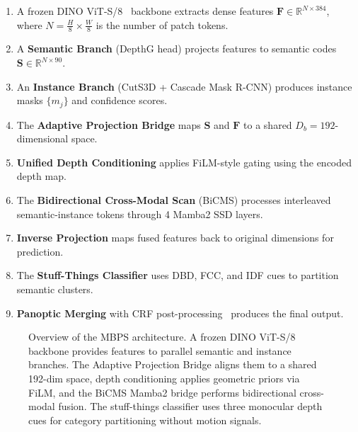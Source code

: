 \documentclass{article}
\begin{document}
\begin{enumerate}
    \item A frozen DINO ViT-S/8~\cite{caron2021dino} backbone extracts dense features $\mathbf{F} \in \mathbb{R}^{N \times 384}$, where $N = \frac{H}{8} \times \frac{W}{8}$ is the number of patch tokens.
    \item A \textbf{Semantic Branch} (DepthG head) projects features to semantic codes $\mathbf{S} \in \mathbb{R}^{N \times 90}$.
    \item An \textbf{Instance Branch} (CutS3D + Cascade Mask R-CNN) produces instance masks $\{m_j\}$ and confidence scores.
    \item The \textbf{Adaptive Projection Bridge} maps $\mathbf{S}$ and $\mathbf{F}$ to a shared $D_b = 192$-dimensional space.
    \item \textbf{Unified Depth Conditioning} applies FiLM-style gating using the encoded depth map.
    \item The \textbf{Bidirectional Cross-Modal Scan} (BiCMS) processes interleaved semantic-instance tokens through 4 Mamba2 SSD layers.
    \item \textbf{Inverse Projection} maps fused features back to original dimensions for prediction.
    \item The \textbf{Stuff-Things Classifier} uses DBD, FCC, and IDF cues to partition semantic clusters.
    \item \textbf{Panoptic Merging} with CRF post-processing~\cite{krahenbuhl2011crf} produces the final output.
\end{enumerate}

\begin{figure}[t]
    \centering
    \caption{Overview of the MBPS architecture. A frozen DINO ViT-S/8 backbone provides features to parallel semantic and instance branches. The Adaptive Projection Bridge aligns them to a shared 192-dim space, depth conditioning applies geometric priors via FiLM, and the BiCMS Mamba2 bridge performs bidirectional cross-modal fusion. The stuff-things classifier uses three monocular depth cues for category partitioning without motion signals.}
    \label{fig:architecture}
\end{figure}
\end{document}
